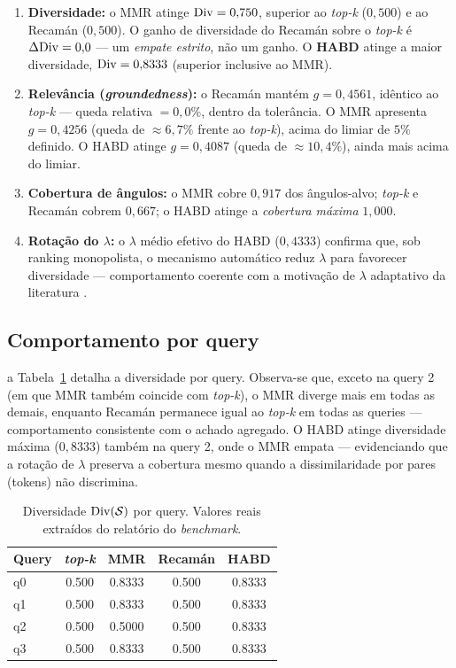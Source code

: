 \begin{enumerate}
  \item \textbf{Diversidade:} o MMR atinge $\mathrm{Div}=0{,}750$, superior ao
        \emph{top-k} ($0{,}500$) e ao Recamán ($0{,}500$). O ganho de diversidade
        do Recamán sobre o \emph{top-k} é $\Delta\mathrm{Div} = 0{,}0$ — um \emph{empate
        estrito}, não um ganho. O \textbf{HABD} atinge a maior diversidade,
        $\mathrm{Div}=0{,}8333$ (superior inclusive ao MMR).
  \item \textbf{Relevância (\emph{groundedness}):} o Recamán mantém
        $\mathit{g}=0{,}4561$, idêntico ao \emph{top-k} — queda relativa $=0{,}0\%$,
        dentro da tolerância. O MMR apresenta $\mathit{g}=0{,}4256$ (queda de
        $\approx 6{,}7\%$ frente ao \emph{top-k}), acima do limiar de $5\%$
        definido. O HABD atinge $\mathit{g}=0{,}4087$ (queda de
        $\approx 10{,}4\%$), ainda mais acima do limiar.
  \item \textbf{Cobertura de ângulos:} o MMR cobre $0{,}917$ dos ângulos-alvo;
        \emph{top-k} e Recamán cobrem $0{,}667$; o HABD atinge a \emph{cobertura
        máxima} $1{,}000$.
  \item \textbf{Rotação do $\lambda$:} o $\lambda$ médio efetivo do HABD
        ($0{,}4333$) confirma que, sob ranking monopolista, o mecanismo
        automático reduz $\lambda$ para favorecer diversidade — comportamento
        coerente com a motivação de $\lambda$ adaptativo da literatura
        \citep{Khan2026DFRAG}.
\end{enumerate}

\subsection{Comportamento por query}

a Tabela~\ref{tab:porquery} detalha a diversidade por query. Observa-se que, exceto
na query 2 (em que MMR também coincide com \emph{top-k}), o MMR diverge mais em
todas as demais, enquanto Recamán permanece igual ao \emph{top-k} em todas as
queries — comportamento consistente com o achado agregado. O HABD atinge diversidade
máxima ($0{,}8333$) também na query 2, onde o MMR empata — evidenciando que a
rotação de $\lambda$ preserva a cobertura mesmo quando a dissimilaridade por pares
(tokens) não discrimina.

\begin{table}[ht]
\centering
\caption{Diversidade $\mathrm{Div}(\mathcal{S})$ por query.
Valores reais extraídos do relatório do \emph{benchmark}.}
\label{tab:porquery}
\begin{tabular}{lcccc}
\toprule
\textbf{Query} & \emph{top-k} & MMR & Recamán & HABD \\
\midrule
q0 & 0.500 & 0.8333 & 0.500 & 0.8333 \\
q1 & 0.500 & 0.8333 & 0.500 & 0.8333 \\
q2 & 0.500 & 0.5000 & 0.500 & 0.8333 \\
q3 & 0.500 & 0.8333 & 0.500 & 0.8333 \\
\bottomrule
\end{tabular}
\end{table}

